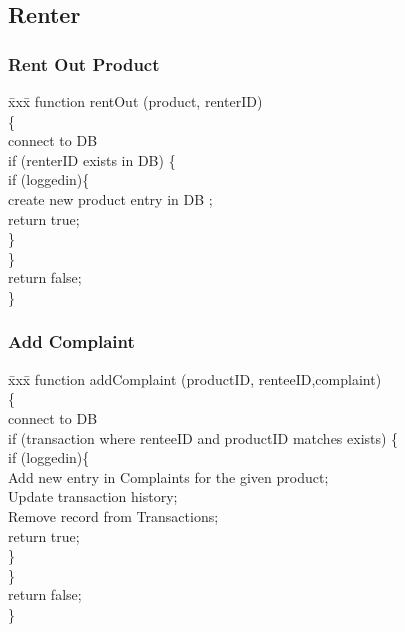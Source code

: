 \documentclass[11pt]{report}
\begin{document}
\begin{figure}[h]
\subsection{Renter}
\subsubsection{Rent Out Product}
\begin{tabbing}
\= xxx\= \kill
function rentOut (product, renterID)\\
\{\\
\hspace{0.3in}connect to DB\\
\hspace{0.3in}if (renterID exists in DB) \{\\
 \hspace{0.6in}if (loggedin)\{\\ 
\hspace{1.2in}create new product entry in DB ;\\
\hspace{1.2in}return true;\\
\hspace{0.6in} \}\\
\hspace{0.3in} \}\\
\hspace{0.3in}return false;\\
\}
\end{tabbing}
\subsubsection{Add Complaint}
\begin{tabbing}
\= xxx\= \kill
function addComplaint (productID, renteeID,complaint)\\
\{\\
\hspace{0.3in}connect to DB\\
\hspace{0.3in}if (transaction where renteeID and productID matches exists) \{\\
 \hspace{0.6in}if (loggedin)\{\\ 
\hspace{1.2in}Add new entry in Complaints for the given product;\\
\hspace{1.2in}Update transaction history;\\
\hspace{1.2in}Remove record from Transactions;\\
\hspace{1.2in}return true;\\
\hspace{0.6in} \}\\
\hspace{0.3in} \}\\
\hspace{0.3in}return false;\\
\}
\end{tabbing}
\end{figure}
\end{document}
